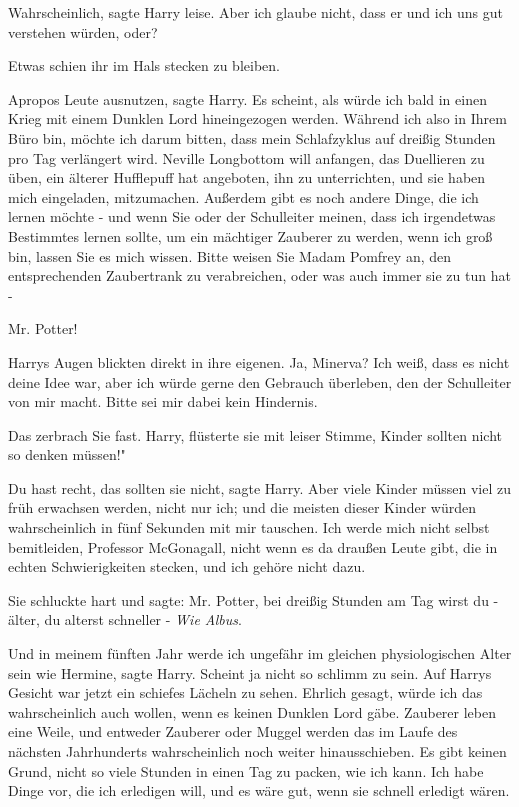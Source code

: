 \glqq{}Wahrscheinlich\grqq{}, sagte Harry leise. \glqq{}Aber ich glaube nicht,
dass er und ich uns gut verstehen würden, oder?\grqq{}

Etwas schien ihr im Hals stecken zu bleiben.

\glqq{}Apropos Leute ausnutzen\grqq{}, sagte Harry. \glqq{}Es scheint, als würde
ich bald in einen Krieg mit einem Dunklen Lord hineingezogen werden. Während ich
also in Ihrem Büro bin, möchte ich darum bitten, dass mein Schlafzyklus auf
dreißig Stunden pro Tag verlängert wird. Neville Longbottom will anfangen, das
Duellieren zu üben, ein älterer Hufflepuff hat angeboten, ihn zu unterrichten,
und sie haben mich eingeladen, mitzumachen. Außerdem gibt es noch andere Dinge,
die ich lernen möchte - und wenn Sie oder der Schulleiter meinen, dass ich
irgendetwas Bestimmtes lernen sollte, um ein mächtiger Zauberer zu werden, wenn
ich groß bin, lassen Sie es mich wissen. Bitte weisen Sie Madam Pomfrey an, den
entsprechenden Zaubertrank zu verabreichen, oder was auch immer sie zu tun hat
-\grqq{}

\glqq{}Mr. Potter!\grqq{}

Harrys Augen blickten direkt in ihre eigenen. \glqq{}Ja, Minerva? Ich weiß, dass
es nicht deine Idee war, aber ich würde gerne den Gebrauch überleben, den der
Schulleiter von mir macht. Bitte sei mir dabei kein Hindernis.\grqq{}

Das zerbrach Sie fast. \glqq{}Harry\grqq{}, flüsterte sie mit leiser Stimme,
\glqq{}Kinder sollten nicht so denken müssen!"

\glqq{}Du hast recht, das sollten sie nicht\grqq{}, sagte Harry. \glqq{}Aber viele
Kinder müssen viel zu früh erwachsen werden, nicht nur ich; und die meisten
dieser Kinder würden wahrscheinlich in fünf Sekunden mit mir tauschen. Ich werde
mich nicht selbst bemitleiden, Professor McGonagall, nicht wenn es da draußen
Leute gibt, die in echten Schwierigkeiten stecken, und ich gehöre nicht
dazu.\grqq{}

Sie schluckte hart und sagte: \glqq{}Mr. Potter, bei dreißig Stunden am Tag wirst
du - älter, du alterst schneller -\grqq{} \emph{Wie Albus}.

\glqq{}Und in meinem fünften Jahr werde ich ungefähr im gleichen physiologischen
Alter sein wie Hermine\grqq{}, sagte Harry. \glqq{}Scheint ja nicht so schlimm zu
sein.\grqq{} Auf Harrys Gesicht war jetzt ein schiefes Lächeln zu sehen. \glqq
Ehrlich gesagt, würde ich das wahrscheinlich auch wollen, wenn es keinen Dunklen
Lord gäbe. Zauberer leben eine Weile, und entweder Zauberer oder Muggel werden
das im Laufe des nächsten Jahrhunderts wahrscheinlich noch weiter
hinausschieben. Es gibt keinen Grund, nicht so viele Stunden in einen Tag zu
packen, wie ich kann. Ich habe Dinge vor, die ich erledigen will, und es wäre
gut, wenn sie schnell erledigt wären.\grqq{}

